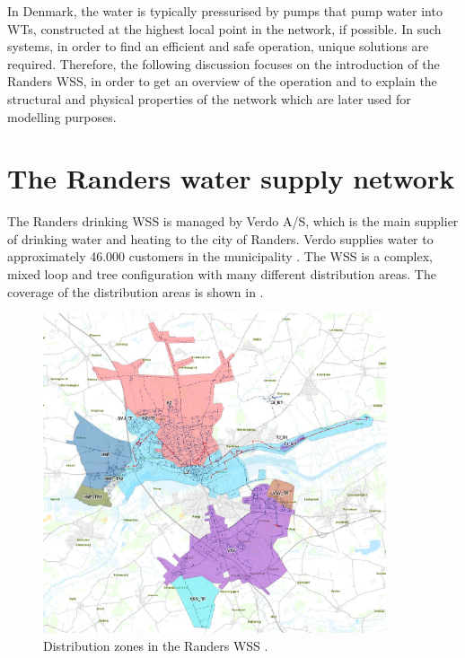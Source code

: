 In Denmark, the water is typically pressurised by pumps that pump water into WTs, constructed at the highest local point in the network, if possible. In such systems, in order to find an efficient and safe operation, unique solutions are required. Therefore, the following discussion focuses on the introduction of the Randers WSS, in order to get an overview of the operation and to explain the structural and physical properties of the network which are later used for modelling purposes. 

\newpage

\section{The Randers water supply network}
\label{the_randers_water_supply_network}

The Randers drinking WSS is managed by Verdo A/S, which is the main supplier of drinking water and heating to the city of Randers. Verdo supplies water to approximately 46.000 customers in the municipality \cite{verdo}. The WSS is a complex, mixed loop and tree configuration with many different distribution areas. The coverage of the distribution areas is shown in .

\begin{figure}[H]
\centering
\includegraphics[width=0.9\textwidth]{report/pictures/level_zones}
\caption{Distribution zones in the Randers WSS \cite{verdo}.}
\label{fig:level_zones}
\end{figure}


